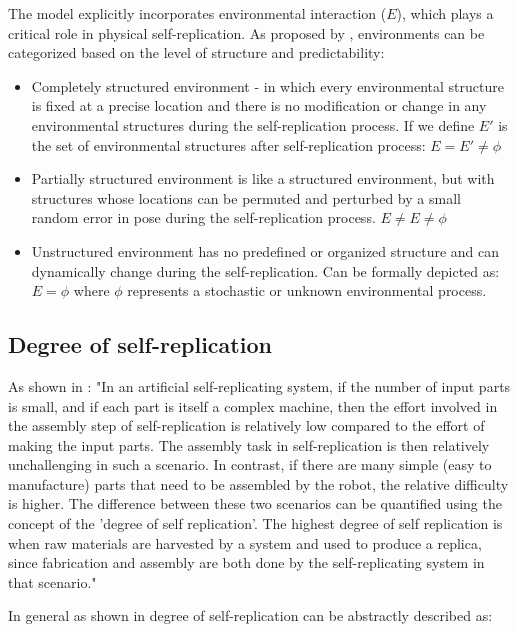 The model explicitly incorporates environmental interaction ($E$), 
which plays a critical role in physical self-replication. 
As proposed by \citeauthor{Eno2007ReplicationNoControl} \cite{Eno2007ReplicationNoControl}, 
environments can be categorized based on the level of structure and predictability:
\begin{itemize}
    \item Completely structured environment - in which every environmental structure is fixed at a precise location 
        and there is no modification or change in any environmental
        structures during the self-replication process. 
        If we define $E'$ is the set of environmental structures after self-replication process:
        $E = E' \neq \phi $ 
    \item Partially structured environment is like a structured environment, but
        with structures whose locations can be permuted and perturbed 
        by a small random error in pose during the self-replication process.
        $ E \neq E \neq \phi $ 
    \item Unstructured environment has no predefined or organized structure and 
        can dynamically change during the self-replication.
        Can be formally depicted as:  
        $ E = \phi $ 
where $\phi$ represents a stochastic or unknown environmental process.
\end{itemize}


\subsection{Degree of self-replication}
As shown in \cite{Chirikjian2022Entropy}:
"In an artificial self-replicating system, if the number of input parts is small,
and if each part is itself a complex machine, then the effort involved in the assembly 
step of self-replication is relatively low compared to the effort of making
the input parts. The assembly task in self-replication is then relatively unchallenging 
in such a scenario. In contrast, if there are many simple (easy to
manufacture) parts that need to be assembled by the robot, the relative difficulty 
is higher. The difference between these two scenarios can be quantified
using the concept of the 'degree of self replication'. The highest degree of self
replication is when raw materials are harvested by a system and used to produce
a replica, since fabrication and assembly are both done by the self-replicating
system in that scenario."

In general as shown in \cite{Chirikjian2022Entropy} degree of self-replication 
can be abstractly described as: 

